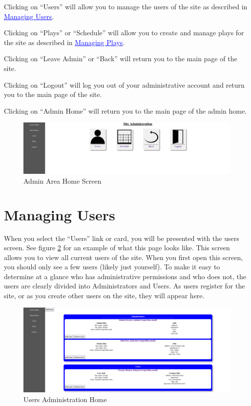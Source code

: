 Clicking on ``Users'' will allow you to manage the users of the site as described in \hyperref[sec:managing_users]{\textcolor{blue}{\underline{Managing Users}}}.

Clicking on ``Plays'' or ``Schedule'' will allow you to create and manage plays for the site as described in \hyperref[sec:managing_plays]{\textcolor{blue}{\underline{Managing Plays}}}.

Clicking on ``Leave Admin'' or ``Back'' will return you to the main page of the site.

Clicking on ``Logout'' will log you out of your administrative account and return you to the main page of the site.

Clicking on ``Admin Home'' will return you to the main page of the admin home.

\begin{figure}[ht]
    \centering
    \includegraphics[width=12cm]{images/chapter2/admin area home}
    \caption{Admin Area Home Screen}
    \label{fig:admin_area_home}
\end{figure}

\section{Managing Users}\label{sec:managing_users}

When you select the ``Users'' link or card, you will be presented with the users screen. See figure \ref{fig:admin_area_user_home} for an example of what this page looks like. This screen allows you to view all current users of the site. When you first open this screen, you should only see a few users (likely just yourself). To make it easy to determine at a glance who has administrative permissions and who does not, the users are clearly divided into Administrators and Users. As users register for the site, or as you create other users on the site, they will appear here.

\begin{figure}
    \centering
    \includegraphics[width=12cm]{images/chapter2/admin area users home}
    \caption{Users Administration Home}
    \label{fig:admin_area_user_home}
\end{figure}

